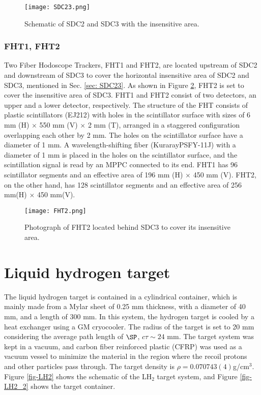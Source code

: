 \begin{figure}[!h]
 \begin{center}
   \texttt{[image: SDC23.png]}
   \caption{Schematic of SDC2 and SDC3 with the insensitive area.}
   \label{fig-SDC23}
 \end{center}
\end{figure}

%
\subsubsection{FHT1, FHT2}
Two Fiber Hodoscope Trackers, FHT1 and FHT2, are located upstream of SDC2 and downstream of SDC3 to cover the horizontal insensitive area of SDC2 and SDC3, mentioned in Sec. \ref{sec: SDC23}. As shown in Figure \ref{fig-FHT2}, FHT2 is set to cover the insensitive area of SDC3.
FHT1 and FHT2 consist of two detectors, an upper and a lower detector, respectively. The structure of the FHT consists of plastic scintillators (EJ212) with holes in the scintillator surface with sizes of 6 mm (H) $\times$ 550 mm (V) $\times$ 2 mm (T), arranged in a staggered configuration overlapping each other by 2 mm. The holes on the scintillator surface have a diameter of 1 mm. A wavelength-shifting fiber (KurarayPSFY-11J) with a diameter of 1 mm is placed in the holes on the scintillator surface, and the scintillation signal is read by an MPPC connected to its end.
FHT1 has 96 scintillator segments and an effective area of 196 mm (H) $\times$ 450 mm (V). FHT2, on the other hand, has 128 scintillator segments and an effective area of 256 mm(H) $\times$ 450 mm(V).

\begin{figure}[!h]
 \begin{center}
   \texttt{[image: FHT2.png]}
   \caption{Photograph of FHT2 located behind SDC3 to cover its insensitive area.}
   \label{fig-FHT2}
 \end{center}
\end{figure}

\section{Liquid hydrogen target}
The liquid hydrogen target is contained in a cylindrical container, which is mainly made from a Mylar sheet of
0.25 mm thickness, with a diameter of 40 mm, and a length of 300 mm. In this system, the hydrogen target is cooled by a heat exchanger using a GM cryocooler. The radius of the target is set to 20 mm considering the average path length of $\SP$, $c\tau\sim 24$ mm. The target system was kept in a vacuum, and carbon fiber reinforced plastic (CFRP) was used as a vacuum vessel to minimize the material in the region where the recoil protons and other particles pass through. The target density is $\rho = 0.070743(4) $g/cm$^{3}$. Figure \ref{fig-LH2} \cite{Nana-D} shows the schematic of the LH$_{2}$ target system, and Figure \ref{fig-LH2_2} \cite{Nana-D} shows the target container.

